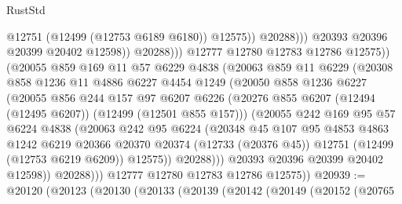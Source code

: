 \begin{lexlean}{RustStd}
\begin{coremodule}
                                    @12751
                                    (@12499 (@12753 @6189 @6180))
                                    @12575))
                                @20288)))
                          @20393
                          @20396
                          @20399
                          @20402
                          @12598))
                      @20288)))
                @12777
                @12780
                @12783
                @12786
                @12575))
            (@20055
              @859
              @169
              @11
              @57
              @6229
              @4838
              (@20063
                @859
                @11
                @6229
                (@20308
                  @858
                  @1236
                  @11
                  @4886
                  @6227
                  @4454
                  @1249
                  (@20050
                    @858
                    @1236
                    @6227
                    (@20055
                      @856
                      @244
                      @157
                      @97
                      @6207
                      @6226
                      (@20276 @855 @6207 (@12494 (@12495 @6207)) (@12499 (@12501 @855 @157)))
                      (@20055
                        @242
                        @169
                        @95
                        @57
                        @6224
                        @4838
                        (@20063
                          @242
                          @95
                          @6224
                          (@20348
                            @45
                            @107
                            @95
                            @4853
                            @4863
                            @1242
                            @6219
                            @20366
                            @20370
                            @20374
                            (@12733 (@20376 @45))
                            @12751
                            (@12499 (@12753 @6219 @6209))
                            @12575))
                        @20288)))
                  @20393
                  @20396
                  @20399
                  @20402
                  @12598))
              @20288)))
        @12777
        @12780
        @12783
        @12786
        @12575))
@20939 := @20120
    (@20123
      (@20130
        (@20133
          (@20139
            (@20142
              (@20149
                (@20152
                  (@20765

\end{coremodule}
\end{lexlean}
